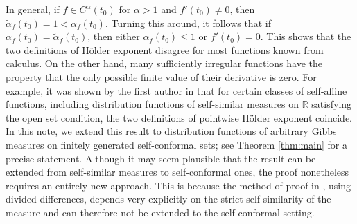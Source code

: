 \documentclass[11pt]{amsart}
\newcommand\RR{\mathbb{R}}
\newcommand{\1}{1}
\begin{document}
In general, if $f\in C^\alpha(t_0)$ for $\alpha>1$ and $f'(t_0)\neq 0$, then $\tilde{\alpha}_f(t_0)=1<\alpha_f(t_0)$. Turning this around, it follows that if $\alpha_f(t_0)=\tilde{\alpha}_f(t_0)$, then either $\alpha_f(t_0)\leq 1$ or $f'(t_0)=0$. This shows that the two definitions of H\"older exponent disagree for most functions known from calculus. On the other hand, many sufficiently irregular functions have the property that the only possible finite value of their derivative is zero.
For example, it was shown by the first author in \cite{Allaart-2018,Allaart-2020} that for certain classes of self-affine functions, including distribution functions of self-similar measures on $\RR$ satisfying the open set condition, the two definitions of pointwise H\"older exponent coincide.
In this note, we extend this result to distribution functions of arbitrary Gibbs measures on finitely generated self-conformal sets; see Theorem \ref{thm:main} for a precise statement. Although it may seem plausible that the result can be extended from self-similar measures to self-conformal ones, the proof nonetheless requires an entirely new approach. This is because the method of proof in \cite{Allaart-2020}, using divided differences, depends very explicitly on the strict self-similarity of the measure and can therefore not be extended to the self-conformal setting.
\end{document}

